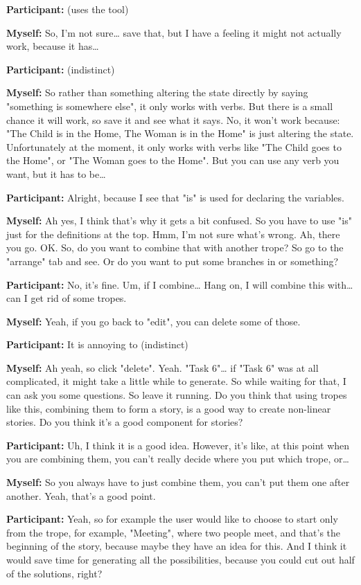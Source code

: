 \documentclass[11pt]{report}
\newcommand{\llabel}[1]{\hypertarget{llineno:#1}{\linelabel{#1}}}
\begin{document}
\begin{linenumbers}
\textbf{Participant:} (uses the tool)

\textbf{Myself:} So, I'm not sure\ldots{} save that, but I have a feeling it might not actually work, because it has\ldots{}

\textbf{Participant:} (indistinct)

\textbf{Myself:} So rather than something altering the state directly by saying "something is somewhere else", it only works with verbs. But there is a small chance it will work, so save it and see what it says. No, it won't work because: "The Child is in the Home, The Woman is in the Home" is just altering the state. Unfortunately at the moment, it only works with verbs like "The Child goes to the Home", or "The Woman goes to the Home". But you can use any verb you want, but it has to be\ldots{}

\textbf{Participant:} Alright, because I see that "is" is used for declaring the variables.

\textbf{Myself:} Ah yes, I think that's why it gets a bit confused. So you have to use "is" just for the definitions at the top. Hmm, I'm not sure what's wrong. Ah, there you go. OK. So, do you want to combine that with another trope? So go to the "arrange" tab and see. Or do you want to put some branches in or something?

\textbf{Participant:} No, it's fine. Um, if I combine\ldots{} Hang on, I will combine this with\ldots{} can I get rid of some tropes.

\textbf{Myself:} Yeah, if you go back to "edit", you can delete some of those.

\textbf{Participant:} It is annoying to (indistinct)

\textbf{Myself:} Ah yeah, so click "delete". Yeah. "Task 6"\ldots{} if "Task 6" was at all complicated, it might take a little while to generate. So while waiting for that, I can ask you some questions. So leave it running. Do you think that using tropes like this, combining them to form a story, is a good way to create non-linear stories. Do you think it's a good component for stories?

\textbf{Participant:} Uh, I think it is a good idea. However, it's like, at this point when you are combining them, you can't really decide where you put which trope, or\ldots{}

\textbf{Myself:} So you always have to just combine them, you can't put them one after another. Yeah, that's a good point.

\textbf{Participant:} Yeah, so for example the user would like to choose to start only from the trope, for example, "Meeting", where two people meet, and that's the beginning of the story, because maybe they have an idea for this. And I think it would save time for generating all the possibilities, because you could cut out half of the solutions, right?\llabel{lne:feature7f}


\end{linenumbers}
\end{document}
